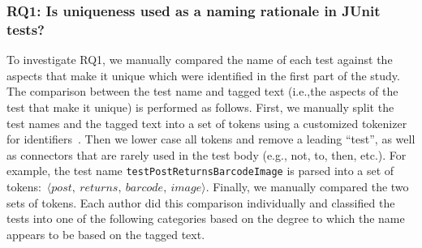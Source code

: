 \subsubsection{RQ1: Is uniqueness used as a naming rationale in JUnit tests?}

To investigate RQ1, we manually compared the name of each test against the aspects that make it unique which were identified in the first part of the study.
%
The comparison between the test name and tagged text (i.e.,the aspects of the test that make it unique) is performed as follows.
%
First, we manually split the test names and the tagged text into a set of tokens using a customized tokenizer for identifiers~\cite{enslen2009mining}.
%
Then we lower case all tokens and remove a leading \enquote{test}, as well as connectors that are rarely used in the test body (e.g., not, to, then, etc.).
%
For example, the test name \texttt{test\-Post\-Returns\-Barcode\-Image} is parsed into a set of tokens:~$\langle post,~returns,~barcode,~image \rangle$.
%
Finally, we manually compared the two sets of tokens.
%
Each author did this comparison individually and classified the tests into one of the following categories based on the degree to which the name appears to be based on the tagged text.

